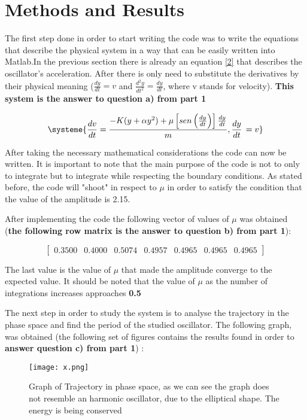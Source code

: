 \documentclass[letterpaper,12pt]{article}
\begin{document}
\section{Methods and Results}
\indent 
The first step done in order to start writing the code was to write the equations that describe the physical system in a way that can be easily written into Matlab.In the previous section there is already an equation \ref{2} that describes the oscillator's acceleration. After there is only need to substitute the derivatives by their physical meaning ($\frac{dy}{dt}=v$ and $\frac{d^2y}{dt^2}=\frac{dy}{dt}$, where v stands for velocity). \textbf{This system is the answer to question a) from part 1 }


\begin{equation}
  \systeme{
\frac{dv}{dt}=\frac{-K(y+\alpha y^2)+\mu\left[ sen\left(\frac{dy}{dt}\right)\right]\frac{dy}{dt}}{m}, 
\frac{dy}{dt}\,=v
  }
\label{3}
\end{equation}

\indent
After taking the necessary mathematical considerations the code can now be written. It is important to note that the main purpose of the code is not to only to integrate but to integrate 
while respecting the boundary conditions. As stated before, the code will "shoot" in respect to $\mu$ in order to satisfy the condition that the value of the amplitude is 2.15.

\newpage
\indent 
After implementing the code the following vector of values of $\mu$ was obtained (\textbf{the following row matrix is the answer to question b) from part 1}):

\begin{equation*}
\begin{bmatrix}
0.3500  &  0.4000  &  0.5074  &  0.4957 &   0.4965  &  0.4965  &  0.4965
\end{bmatrix}
\end{equation*}

\indent 
The last value is the value of $\mu$ that made the amplitude converge to the expected value. It should be noted that the value of $\mu$ as the number of integrations increases approaches \textbf{0.5} 


\indent
The next step in order to study the system is to analyse the trajectory in the phase space and find the period of the studied oscillator. The following graph, was obtained (the following set of figures contains the results found in order to\textbf{ answer question c) from part 1}) :

\begin{figure}[h]
  \centering
    \texttt{[image: x.png]}     
    \caption{Graph of Trajectory in phase space, as we can see the graph does not resemble an harmonic oscillator, due to the elliptical shape. The energy is being conserved}
\end{figure} 
\end{document}
